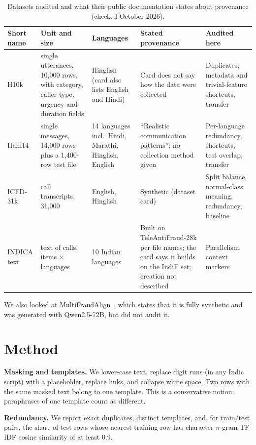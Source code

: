 \documentclass[conference]{IEEEtran}
\begin{document}
\begin{table}[t]
\centering
\caption{Datasets audited and what their public documentation states about provenance (checked October 2026).}
\label{tab:data}
\small
\begin{tabular}{p{1.9cm}p{2.7cm}p{2.5cm}p{4.2cm}p{4.2cm}}
\toprule
Short name & Unit and size & Languages & Stated provenance & Audited here \\
\midrule
H10k~\cite{h10kdata} & single utterances, 10{,}000 rows, with category, caller type, urgency and duration fields & Hinglish (card also lists English and Hindi) & Card does not say how the data were collected & Duplicates, metadata and trivial-feature shortcuts, transfer \\
Ham14~\cite{ham14data} & single messages, 14{,}000 rows plus a 1{,}400-row test file & 14 languages incl.\ Hindi, Marathi, Hinglish, English & ``Realistic communication patterns''; no collection method given & Per-language redundancy, shortcuts, test overlap, transfer \\
ICFD-31k~\cite{ahuja2026icfd} & call transcripts, 31{,}000 & English, Hinglish & Synthetic (dataset card) & Split balance, normal-class meaning, redundancy, baseline \\
INDICA text~\cite{indicadata} & text of calls, \InN{} items $\times$ \InLangs{} languages & 10 Indian languages & Built on TeleAntiFraud-28k per file names; the card says it builds on the IndiF set; creation not described & Parallelism, context markers \\
\bottomrule
\end{tabular}
\end{table}

We also looked at MultiFraudAlign~\cite{mfadata}, which states that it is fully synthetic and was generated with Qwen2.5-72B, but did not audit it.

\section{Method}
\label{sec:method}
\textbf{Masking and templates.} We lower-case text, replace digit runs (in any Indic script) with a placeholder, replace links, and collapse white space. Two rows with the same masked text belong to one template. This is a conservative notion: paraphrases of one template count as different.

\textbf{Redundancy.} We report exact duplicates, distinct templates, and, for train/test pairs, the share of test rows whose nearest training row has character $n$-gram TF-IDF cosine similarity of at least 0.9.
\end{document}
